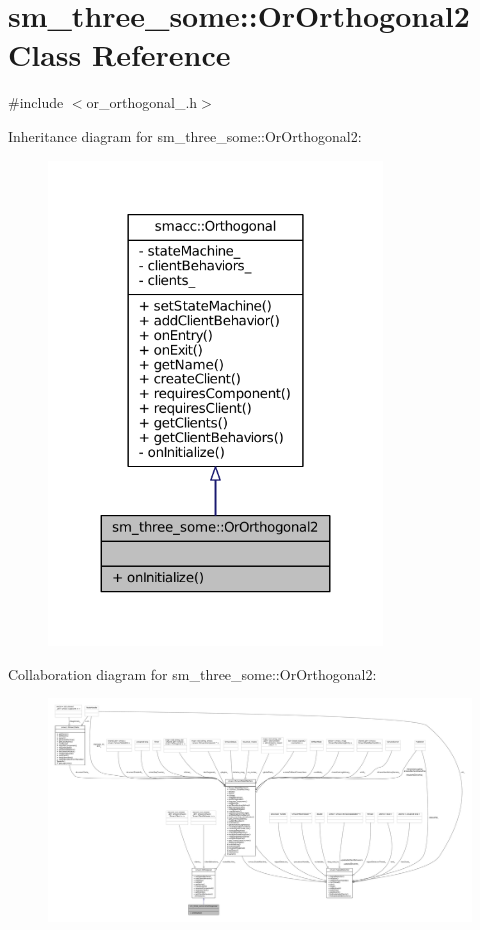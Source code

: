 \hypertarget{classsm__three__some_1_1OrOrthogonal2}{}\section{sm\+\_\+three\+\_\+some\+:\+:Or\+Orthogonal2 Class Reference}
\label{classsm__three__some_1_1OrOrthogonal2}


{\ttfamily \#include $<$or\+\_\+orthogonal\+\_.\+h$>$}



Inheritance diagram for sm\+\_\+three\+\_\+some\+:\+:Or\+Orthogonal2\+:
\nopagebreak
\begin{figure}[H]
\begin{center}
\leavevmode
\includegraphics[width=251pt]{classsm__three__some_1_1OrOrthogonal2__inherit__graph}
\end{center}
\end{figure}


Collaboration diagram for sm\+\_\+three\+\_\+some\+:\+:Or\+Orthogonal2\+:
\nopagebreak
\begin{figure}[H]
\begin{center}
\leavevmode
\includegraphics[width=350pt]{classsm__three__some_1_1OrOrthogonal2__coll__graph}
\end{center}
\end{figure}
